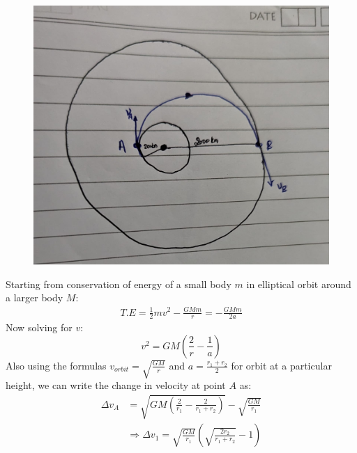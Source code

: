 \documentclass[a4paper, 12pt]{exam}
\begin{document}
		\begin{figure}[h!]
			\centering
			\includegraphics[scale = 0.1]{image1_ADCS}
			\caption{}
		\end{figure}
		Starting from conservation of energy of a small body $m$ in elliptical orbit around a larger body $M$:
		\begin{equation}
			\begin{split}
				T.E = \frac{1}{2}mv^2 - \frac{GMm}{r} = -\frac{GMm}{2a}
			\end{split}
		\end{equation}
		Now solving for $v$:
		\begin{equation}
			v^2 = GM\left(\frac{2}{r} - \frac{1}{a}\right)
		\end{equation}
		Also using the formulas $v_{orbit} = \sqrt{\frac{GM}{r}}$ and $a = \frac{r_1+r_2}{2}$ for orbit at a particular height, we can write the change in velocity at point $A$ as:
		\begin{equation}
			\begin{split}
				\Delta v_A &= \sqrt{GM\left(\frac{2}{r_1} - \frac{2}{r_1 + r_2}\right)} - \sqrt{\frac{GM}{r_1}} \\
				&\Rightarrow \Delta v_1 = \sqrt{\frac{GM}{r_1}}\left(\sqrt{\frac{2r_2}{r_1 + r_2}}-1\right)
			\end{split}
		\end{equation}
		
\end{document}
